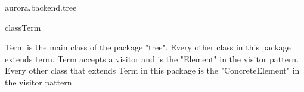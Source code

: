 \begin{texdocpackage}{aurora.backend.tree}
\begin{texdocclass}{class}{Term}{}{}
\label{texdoclet:aurora.backend.tree.Term}
\begin{texdocclassintro}
Term is the main class of the package "tree". Every other class in this package extends term.
 Term accepts a visitor and is the "Element" in the visitor pattern.
 Every other class that extends Term in this package is the "ConcreteElement" in the visitor pattern.\end{texdocclassintro}
\begin{texdocclassconstructors}
\end{texdocclassconstructors}
\begin{texdocclassmethods}
\end{texdocclassmethods}
\end{texdocclass}


\end{texdocpackage}



